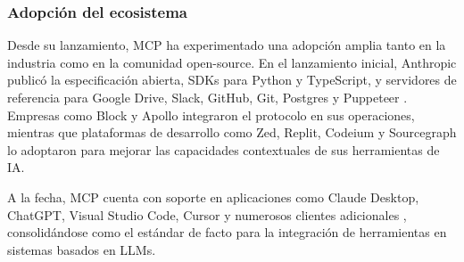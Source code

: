 \subsubsection{Adopción del ecosistema}

Desde su lanzamiento, MCP ha experimentado una adopción amplia tanto en la
industria como en la comunidad open-source. En el lanzamiento inicial,
Anthropic publicó la especificación abierta, SDKs para Python y TypeScript, y
servidores de referencia para Google Drive, Slack, GitHub, Git, Postgres y
Puppeteer \citep{anthropic2024mcp}. Empresas como Block y Apollo integraron
el protocolo en sus operaciones, mientras que plataformas de desarrollo como
Zed, Replit, Codeium y Sourcegraph lo adoptaron para mejorar las capacidades
contextuales de sus herramientas de IA.

A la fecha, MCP cuenta con soporte en aplicaciones como Claude Desktop,
ChatGPT, Visual Studio Code, Cursor y numerosos clientes adicionales
\citep{mcpspec2024}, consolidándose como el estándar de facto para la
integración de herramientas en sistemas basados en LLMs.
